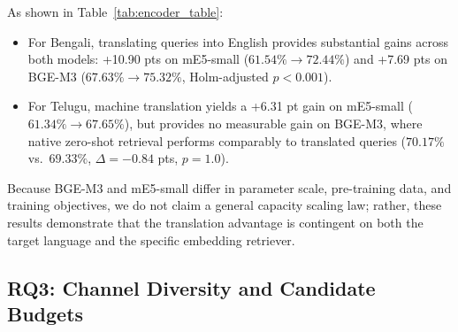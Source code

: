 \documentclass[11pt]{article}
\begin{document}
\begin{table}[t]
\centering
\small
{}
\caption{RQ2: Effect of English translation across retrievers (R@5kc). Translation improves Bengali retrieval across both models, while native Telugu retrieval matches MT on BGE-M3.}
\label{tab:encoder_table}
\end{table}

As shown in Table~\ref{tab:encoder_table}:
\begin{itemize}
    \item For Bengali, translating queries into English provides substantial gains across both models: +10.90 pts on mE5-small ($61.54\% \to 72.44\%$) and +7.69 pts on BGE-M3 ($67.63\% \to 75.32\%$, Holm-adjusted $p < 0.001$).
    \item For Telugu, machine translation yields a +6.31 pt gain on mE5-small ($61.34\% \to 67.65\%$), but provides no measurable gain on BGE-M3, where native zero-shot retrieval performs comparably to translated queries ($70.17\%$ vs.\ $69.33\%$, $\Delta = -0.84$ pts, $p=1.0$).
\end{itemize}
Because BGE-M3 and mE5-small differ in parameter scale, pre-training data, and training objectives, we do not claim a general capacity scaling law; rather, these results demonstrate that the translation advantage is contingent on both the target language and the specific embedding retriever.

\subsection{RQ3: Channel Diversity and Candidate Budgets}
\label{sec:rq3_results}
\end{document}
